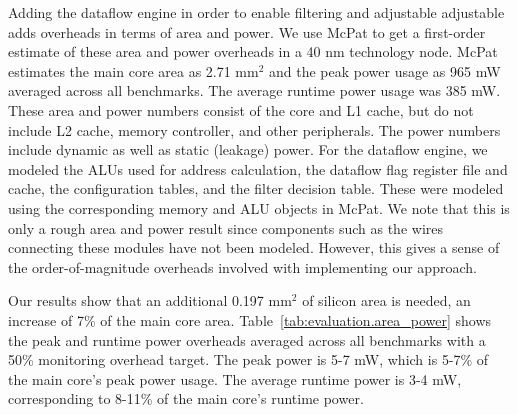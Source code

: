 Adding the dataflow engine in order to enable filtering and adjustable adjustable adds
overheads in terms of area and power. We use McPat \cite{mcpat-micro09} to get
a first-order estimate of these area and power overheads in a 40 nm technology
node. McPat estimates the main core area as 2.71 mm$^2$ and the peak power usage as
965 mW averaged across all benchmarks. The average runtime power usage was 385 
mW. These area and power numbers consist of the core and
L1 cache, but do not include L2 cache, memory controller, and other
peripherals. The power numbers include dynamic as well as static (leakage)
power. For the dataflow engine, we modeled the ALUs used for address
calculation, the dataflow flag register file and cache, the configuration
tables, and the filter decision table. These were modeled using the
corresponding memory and ALU objects in McPat. We
note that this is only a rough area and power result since components such as the
wires connecting these modules have not been modeled. However, this gives a
sense of the order-of-magnitude overheads involved with implementing our
approach.

Our results show that an additional 0.197 mm$^2$ of silicon area is needed, an
increase of 7\% of the main core area. Table~\ref{tab:evaluation.area_power}
shows the peak and runtime power overheads averaged across all benchmarks with
a 50\% monitoring overhead target. The peak power is 5-7 mW, which is
5-7\% of the main core's peak power usage. The average runtime power is 3-4 
mW, corresponding to 8-11\% of the main core's runtime power.

